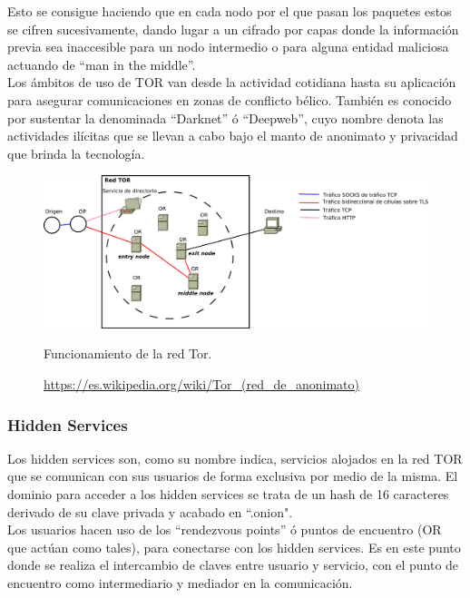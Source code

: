 Esto se consigue haciendo que en cada nodo por el que pasan los paquetes estos se cifren sucesivamente, dando lugar a un cifrado por capas donde la información previa sea inaccesible para un nodo intermedio o para alguna entidad maliciosa actuando de \hyphenquote{spanish}{man in the middle}. \\


Los ámbitos de uso de TOR van desde la actividad cotidiana hasta su aplicación para asegurar comunicaciones en zonas de conflicto bélico. También es conocido por sustentar la denominada \hyphenquote{spanish}{Darknet} ó \hyphenquote{spanish}{Deepweb}, cuyo nombre denota las actividades ilícitas que se llevan a cabo bajo el manto de anonimato y privacidad que brinda la tecnología. \\

\begin{figure}[H]
	\centering
	\includegraphics[width=\textwidth]{imagenes/funcionamiento_tor}
	\caption{Funcionamiento de la red Tor.}
	\caption*{\small \url {https://es.wikipedia.org/wiki/Tor_(red_de_anonimato)}}
	\label{fig:redtor}
\end{figure}

\subsubsection {Hidden Services}

Los hidden services son, como su nombre indica, servicios alojados en la red TOR que se comunican con sus usuarios de forma exclusiva por medio de la misma. El dominio para acceder a los hidden services se trata de un hash de 16 caracteres derivado de su clave privada y acabado en ``.onion". \\

Los usuarios hacen uso de los \hyphenquote{spanish}{rendezvous points} ó puntos de encuentro (OR que actúan como tales), para conectarse con los hidden services. Es en este punto donde se realiza el intercambio de claves entre usuario y servicio, con el punto de encuentro como intermediario y mediador en la comunicación. \\ 



